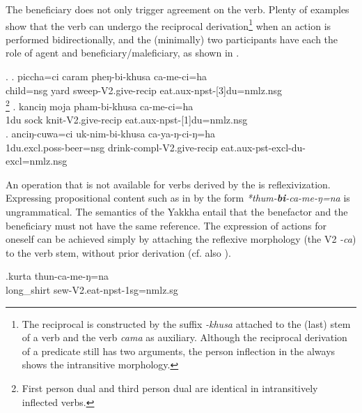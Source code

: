 The beneficiary does not only trigger agreement on the verb. Plenty of examples show that the  verb can undergo the reciprocal derivation\footnote{The reciprocal is constructed by the suffix \emph{-khusa} attached to the (last) stem of a verb and the verb \emph{cama}  as auxiliary. Although the  reciprocal derivation of a  predicate still has two arguments, the person inflection in the  always shows the intransitive morphology.} when an action is performed bidirectionally, and the (minimally) two participants have each the role of agent and beneficiary/maleficiary, as shown in \Next.  

\ex. \ag. piccha=ci caram pheŋ-bi-khusa ca-me-ci=ha\\
 child{\sc =nsg} yard sweep-{\sc V2.give-recip} eat{\sc .aux-npst-[3]du=nmlz.nsg}\\
\footnote{First person dual  and third person dual are  identical in intransitively inflected verbs.}
\bg. kanciŋ moja pham-bi-khusa ca-me-ci=ha\\
 {\sc 1du} sock knit-{\sc V2.give-recip} eat{\sc .aux-npst-[1]du=nmlz.nsg}\\
 \bg. anciŋ-cuwa=ci uk-nim-bi-khusa ca-ya-ŋ-ci-ŋ=ha\\
 {\sc 1du.excl.poss}-beer{\sc =nsg} drink-{\sc compl-V2.give-recip} eat{\sc .aux-pst-excl-du-excl=nmlz.nsg}\\
 
 
An operation that is not available for verbs derived by the  is reflexivization. Expressing propositional content such as in  \Next by the form \emph{*thum-\textbf{bi}-ca-me-ŋ=na} is ungrammatical. The semantics of the Yakkha  entail that the benefactor and the beneficiary must not have the same reference. The expression of actions for oneself can be achieved simply by attaching the reflexive morphology (the V2 \emph{-ca}) to the verb stem, without prior  derivation (cf. also ).

\exg.kurta thun-ca-me-ŋ=na \\
	long\_shirt sew{\sc -V2.eat-npst-1sg=nmlz.sg} 	\\



